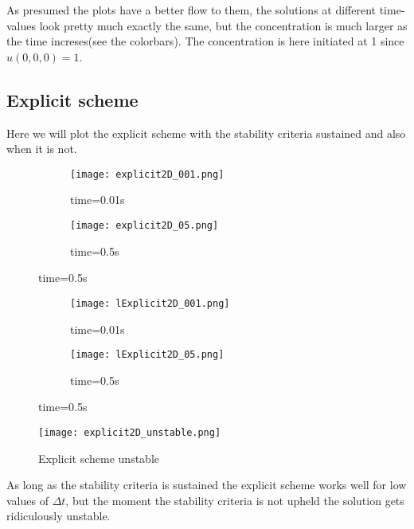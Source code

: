 \documentclass[a4paper,11pt]{article}
\begin{document}
    As presumed the plots have a better flow to them, the solutions at different time-values look pretty much exactly the same, but the concentration is much larger as the time increses(see the colorbars). The concentration is here initiated at 1 since $u(0,0,0)=1$.

\subsection{Explicit scheme}
    Here we will plot the explicit scheme with the stability criteria sustained and also when it is not.
    \begin{figure}[H]
        \caption{Explicit scheme $\Delta t=0.000005$}
        \captionsetup[subfigure]{labelformat=empty}
        \begin{subfigure}[b!]{0.55\textwidth}
            \texttt{[image: explicit2D\_001.png]}
            \caption{time=0.01s}
        \end{subfigure}
        \begin{subfigure}[b!]{0.55\textwidth}
            \texttt{[image: explicit2D\_05.png]}
            \caption{time=0.5s}
        \end{subfigure}
    \end{figure}
    \begin{figure}[H]
        \caption{Explicit scheme $\Delta t=0.005$}
        \captionsetup[subfigure]{labelformat=empty}
        \begin{subfigure}[b!]{0.55\textwidth}
            \texttt{[image: lExplicit2D\_001.png]}
            \caption{time=0.01s}
        \end{subfigure}
        \begin{subfigure}[b!]{0.55\textwidth}
            \texttt{[image: lExplicit2D\_05.png]}
            \caption{time=0.5s}
        \end{subfigure}
    \end{figure}
    \begin{figure}[H]
        \caption{Explicit scheme unstable}
        \centering
        \texttt{[image: explicit2D\_unstable.png]}
    \end{figure}
    
    As long as the stability criteria is sustained the explicit scheme works well for low values of $\Delta t$, but the moment the stability criteria is not upheld the solution gets ridiculously unstable. 

\newpage
\end{document}

